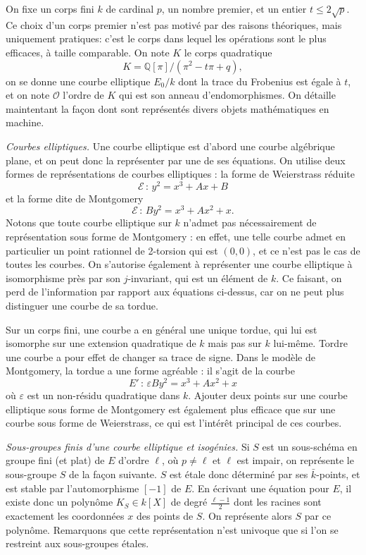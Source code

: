 \documentclass[11pt,a4paper]{article}
\newcommand{\Q}{\mathbb{Q}}
\newcommand{\E}{\mathcal{E}}
\renewcommand{\O}{\mathcal{O}}
\newcommand{\de}{\,:\,}
\renewcommand{\v}{\vspace{5mm}}
\theoremstyle{definition}
\begin{document}
On fixe un corps fini $k$ de cardinal $p$, un nombre premier, et un entier $t\leq 2\sqrt{p}$. Ce choix d'un corps premier n'est pas motivé par des raisons théoriques, mais uniquement pratiques: c'est le corps dans lequel les opérations sont le plus efficaces, à taille comparable. On note $K$ le corps quadratique
$$K = \Q[\pi] / (\pi^2 - t\pi + q),$$
on se donne une courbe elliptique $E_0/k$ dont la trace du Frobenius est égale à $t$, et on note $\O$ l'ordre de $K$ qui est son anneau d'endomorphismes. On détaille maintentant la façon dont sont représentés divers objets mathématiques \og en machine\fg.

\v

\emph{Courbes elliptiques.} Une courbe elliptique est d'abord une courbe algébrique plane, et on peut donc la représenter par une de ses équations. On utilise deux formes de représentations de courbes elliptiques : la forme de Weierstrass réduite
$$\E\de y^2 = x^3 + Ax + B$$
et la forme dite de Montgomery
$$\E\de B y^2 = x^3 + A x^2 + x.$$
Notons que toute courbe elliptique sur $k$ n'admet pas nécessairement de représentation sous forme de Montgomery : en effet, une telle courbe admet en particulier un point rationnel de 2-torsion qui est $(0,0)$, et ce n'est pas le cas de toutes les courbes.
On s'autorise également à représenter une courbe elliptique à isomorphisme près par son $j$-invariant, qui est un élément de $k$. Ce faisant, on perd de l'information par rapport aux équations ci-dessus, car on ne peut plus distinguer une courbe de sa tordue.

Sur un corps fini, une courbe a en général une unique tordue, qui lui est isomorphe sur une extension quadratique de $k$ mais pas sur $k$ lui-même. Tordre une courbe a pour effet de changer sa trace de signe. Dans le modèle de Montgomery, la tordue a une forme agréable : il s'agit de la courbe
$$E'\de \varepsilon B y^2 = x^3 + Ax^2 + x$$
où $\varepsilon$ est un non-résidu quadratique dans $k$. Ajouter deux points sur une courbe elliptique sous forme de Montgomery est également plus efficace que sur une courbe sous forme de Weierstrass, ce qui est l'intérêt principal de ces courbes.
\v

\emph{Sous-groupes finis d'une courbe elliptique et isogénies.} Si $S$ est un sous-schéma en groupe fini (et plat) de $E$ d'ordre $\ell$, où $p\neq \ell$ et $\ell$ est impair, on représente le sous-groupe $S$ de la façon suivante. $S$ est étale donc déterminé par ses $\bar{k}$-points, et est stable par l'automorphisme $[-1]$ de $E$.
En écrivant une équation pour $E$, il existe donc un polynôme $K_S\in k[X]$ de degré $\frac{\ell-1}{2}$ dont les racines sont exactement les coordonnées $x$ des points de $S$. On représente alors $S$ par ce polynôme. Remarquons que cette représentation n'est univoque que si l'on se restreint aux sous-groupes étales.
\end{document}
